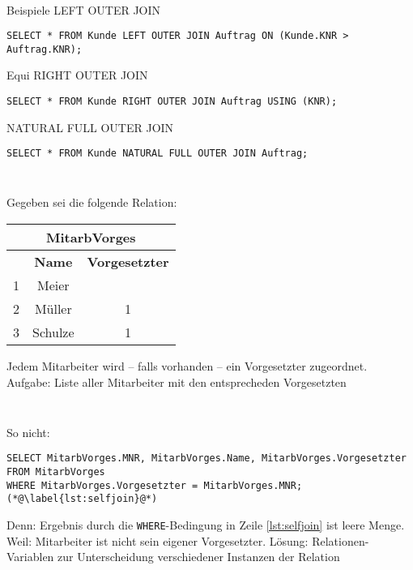 \begin{frame}[fragile]\frametitle{\insertsection}
\framesubtitle{\insertsubsection}
\onslide
{}\\[4pt]
Beispiele
\abs
LEFT OUTER JOIN
\begin{lstlisting}[xleftmargin=3ex, numbers=none]
SELECT * FROM Kunde LEFT OUTER JOIN Auftrag ON (Kunde.KNR > Auftrag.KNR);
\end{lstlisting}
\abs
Equi RIGHT OUTER JOIN
\begin{lstlisting}[xleftmargin=3ex, numbers=none]
SELECT * FROM Kunde RIGHT OUTER JOIN Auftrag USING (KNR);
\end{lstlisting}
\abs 
NATURAL FULL OUTER JOIN
\begin{lstlisting}[xleftmargin=3ex, numbers=none]
SELECT * FROM Kunde NATURAL FULL OUTER JOIN Auftrag;
\end{lstlisting}
\end{frame}

\begin{frame}[fragile]\frametitle{\insertsection}
\framesubtitle{\insertsubsection}
\\[4pt]
Gegeben sei die folgende Relation:
\begin{center}
	\begin{tabular}{|c|c|c|}\hline
		\multicolumn{3}{|c|}{\footnotesize \textbf{MitarbVorges}}\\\hline\hline
		\footnotesize \textbf{\key{MNR}} &\footnotesize{\textbf{Name}} & \footnotesize \textbf{Vorgesetzter}  \\\hline
		\footnotesize 1 &\footnotesize Meier& \footnotesize \\\hline
		\footnotesize 2 &\footnotesize Müller&\footnotesize  1 \\\hline
		\footnotesize 3 &\footnotesize Schulze&\footnotesize  1 \\\hline
	\end{tabular}
\end{center}
Jedem Mitarbeiter wird -- falls vorhanden -- ein Vorgesetzter zugeordnet.\\[4pt]
Aufgabe: Liste aller Mitarbeiter mit den entsprecheden Vorgesetzten
\end{frame}

\begin{frame}[fragile]\frametitle{\insertsection}
\framesubtitle{\insertsubsection}
\onslide 
{}\\[4pt]
\alert{So nicht:}
\begin{lstlisting}[xleftmargin=3ex]
SELECT MitarbVorges.MNR, MitarbVorges.Name, MitarbVorges.Vorgesetzter
FROM MitarbVorges
WHERE MitarbVorges.Vorgesetzter = MitarbVorges.MNR; (*@\label{lst:selfjoin}@*)
\end{lstlisting}
\pause
Denn: Ergebnis durch die \texttt{WHERE}-Bedingung in Zeile \ref{lst:selfjoin} ist leere Menge.\\
Weil: Mitarbeiter ist nicht sein eigener Vorgesetzter.
\pause\abs 
L\"osung: Relationen-Variablen zur Unterscheidung verschiedener Instanzen der Relation
\end{frame}

